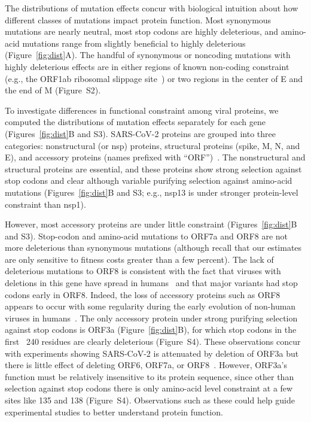 \documentclass[9pt,twocolumn,twoside]{gsajnl_modified}
\begin{document}
The distributions of mutation effects concur with biological intuition about how different classes of mutations impact protein function.
Most synonymous mutations are nearly neutral, most stop codons are highly deleterious, and amino-acid mutations range from slightly beneficial to highly deleterious (Figure~\ref{fig:dist}A).
The handful of synonymous or noncoding mutations with highly deleterious effects are in either regions of known non-coding constraint (e.g., the ORF1ab ribosomal slippage site~\cite{bhatt2021structural}) or two regions in the center of E and the end of M (Figure~S2).

To investigate differences in functional constraint among viral proteins, we computed the distributions of mutation effects separately for each gene (Figures~\ref{fig:dist}B and S3).
SARS-CoV-2 proteins are grouped into three categories: nonstructural (or nsp) proteins, structural proteins (spike, M, N, and E), and accessory proteins (names prefixed with ``ORF'')~\citep{v2021coronavirus}.
The nonstructural and structural proteins are essential, and these proteins show strong selection against stop codons and clear although variable purifying selection against amino-acid mutations (Figures~\ref{fig:dist}B and S3; e.g., nsp13 is under stronger protein-level constraint than nsp1).

However, most accessory proteins are under little constraint (Figures~\ref{fig:dist}B and S3).
Stop-codon and amino-acid mutations to ORF7a and ORF8 are not more deleterious than synonymous mutations (although recall that our estimates are only sensitive to fitness costs greater than a few percent).
The lack of deleterious mutations to ORF8 is consistent with the fact that viruses with deletions in this gene have spread in humans~\citep{su2020discovery} and that major variants had stop codons early in ORF8.
Indeed, the loss of accessory proteins such as ORF8 appears to occur with some regularity during the early evolution of non-human viruses in humans~\citep{rochman2022molecular}.
The only accessory protein under strong purifying selection against stop codons is ORF3a (Figure~\ref{fig:dist}B), for which stop codons in the first ~240 residues are clearly deleterious (Figure~S4).
These observations concur with experiments showing SARS-CoV-2 is attenuated by deletion of ORF3a but there is little effect of deleting ORF6, ORF7a, or ORF8~\citep{mcgrath2022sars,silvas2021contribution,liu2022live}.
However, ORF3a's function must be relatively insensitive to its protein sequence, since other than selection against stop codons there is only amino-acid level constraint at a few sites like 135 and 138 (Figure~S4).
Observations such as these could help guide experimental studies to better understand protein function.
\end{document}
